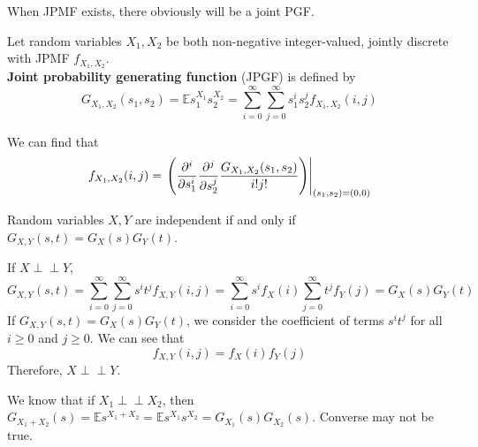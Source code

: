 \documentclass{huhtakm-template-book}
\newcommand{\independent}{\perp\!\!\!\perp}
\newcommand{\expect}{\mathbb{E}}
\begin{document}
    When JPMF exists, there obviously will be a joint PGF.
    \begin{defn}
        Let random variables $X_{1},X_{2}$ be both non-negative integer-valued, jointly discrete with JPMF $f_{X_{1},X_{2}}$.\\
        \textbf{Joint probability generating function} (JPGF) is defined by
        \begin{equation*}
            G_{X_{1},X_{2}}(s_{1},s_{2})=\expect s_{1}^{X_{1}}s_{2}^{X_{2}}=\sum_{i=0}^{\infty}\sum_{j=0}^{\infty}s_{1}^{i}s_{2}^{j}f_{X_{1},X_{2}}(i,j)
        \end{equation*}
    \end{defn}
    \begin{rem}
        We can find that
        \begin{equation*}
            f_{X_{1},X_{2}}(i,j)=\left.\left(\pdv*[order={i}]{\pdv*[order={j}]{\frac{G_{X_{1},X_{2}}(s_{1},s_{2})}{i!j!}}{s_{2}}}{s_{1}}\right)\right|_{(s_{1},s_{2})=(0,0)}
        \end{equation*}
    \end{rem}
    \begin{thm}
        Random variables $X,Y$ are independent if and only if $G_{X,Y}(s,t)=G_{X}(s)G_{Y}(t)$.
    \end{thm}
    \begin{proofing}
        If $X\independent Y$,
        \begin{equation*}
            G_{X,Y}(s,t)=\sum_{i=0}^{\infty}\sum_{j=0}^{\infty}s^{i}t^{j}f_{X,Y}(i,j)=\sum_{i=0}^{\infty}s^{i}f_{X}(i)\sum_{j=0}^{\infty}t^{j}f_{Y}(j)=G_{X}(s)G_{Y}(t)
        \end{equation*}
        If $G_{X,Y}(s,t)=G_{X}(s)G_{Y}(t)$, we consider the coefficient of terms $s^{i}t^{j}$ for all $i\geq 0$ and $j\geq 0$. We can see that
        \begin{equation*}
            f_{X,Y}(i,j)=f_{X}(i)f_{Y}(j)
        \end{equation*}
        Therefore, $X\independent Y$.
    \end{proofing}
    \begin{rem}
        We know that if $X_{1}\independent X_{2}$, then $G_{X_{1}+X_{2}}(s)=\expect s^{X_{1}+X_{2}}=\expect s^{X_{1}}s^{X_{2}}=G_{X_{1}}(s)G_{X_{2}}(s)$. Converse may not be true.
    \end{rem}
\end{document}
